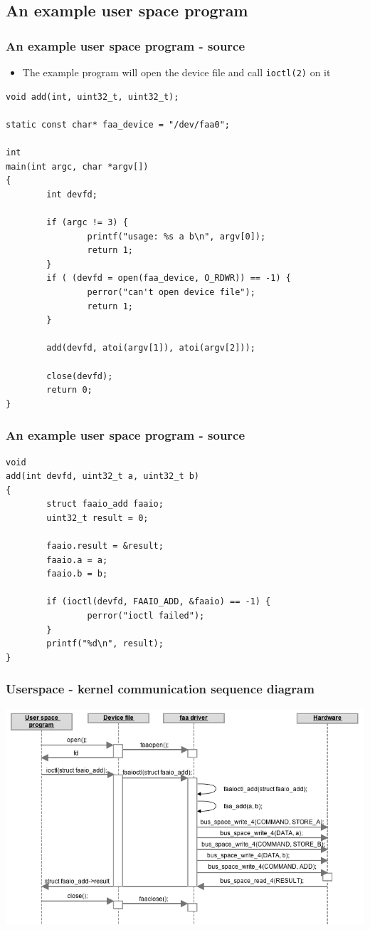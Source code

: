 \documentclass[dvipsnames,table]{beamer}
\begin{document}
\subsection{An example user space program}

\begin{frame}[fragile]
\frametitle{An example user space program - source}
\begin{itemize}
	\item The example program will open the device file and call {\tt ioctl(2)} on it
\end{itemize}
\begin{lstlisting}
void add(int, uint32_t, uint32_t);

static const char* faa_device = "/dev/faa0";

int
main(int argc, char *argv[])
{
        int devfd;

        if (argc != 3) {
                printf("usage: %s a b\n", argv[0]);
                return 1;
        }
        if ( (devfd = open(faa_device, O_RDWR)) == -1) {
                perror("can't open device file");
                return 1;
        }

        add(devfd, atoi(argv[1]), atoi(argv[2]));

        close(devfd);
        return 0;
}
\end{lstlisting}
\end{frame}

\begin{frame}[fragile]
\frametitle{An example user space program - source}
\begin{lstlisting}
void
add(int devfd, uint32_t a, uint32_t b)
{
        struct faaio_add faaio;
        uint32_t result = 0;

        faaio.result = &result;
        faaio.a = a;
        faaio.b = b;

        if (ioctl(devfd, FAAIO_ADD, &faaio) == -1) {
                perror("ioctl failed");
        }
        printf("%d\n", result);
}
\end{lstlisting}
\end{frame}

\begin{frame}
\frametitle{Userspace - kernel communication sequence diagram}
\vspace*{-0.8cm}
\begin{center}
\includegraphics[scale=0.45]{basicflow.png}
\end{center}
\end{frame}
\end{document}

